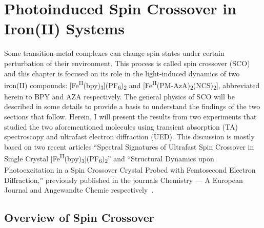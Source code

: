 



\chapter{Photoinduced Spin Crossover in Iron(II) Systems}
\label{ch: SCO}

Some transition-metal complexes can change spin states under certain perturbation of
their environment. This process is called spin crossover (SCO) and this chapter is focused
on its role in the light-induced dynamics of two iron(II) compounds:
[Fe\textsuperscript{II}(bpy)\textsubscript{3}](PF\textsubscript{6})\textsubscript{2}
and [Fe\textsuperscript{II}(PM-AzA)\textsubscript{2}(NCS)\textsubscript{2}],
abbreviated herein to BPY and AZA respectively.
%
The general physics of SCO will be described in some details to provide a basis to
understand the findings of the two sections that follow. Herein, I will present
the results from two experiments that studied the two aforementioned molecules
using transient absorption (TA) spectroscopy and ultrafast electron diffraction (UED).
This discussion is mostly based on two recent articles ``Spectral Signatures of Ultrafast
Spin Crossover in Single Crystal
[Fe\textsuperscript{II}(bpy)\textsubscript{3}](PF\textsubscript{6})\textsubscript{2}''
and ``Structural Dynamics upon Photoexcitation in a Spin Crossover Crystal Probed with
Femtosecond Electron Diffraction,'' previously published in the journals
Chemistry --- A European Journal and Angewandte Chemie respectively~\cite{Field2016, Jiang2017}.


\section{Overview of Spin Crossover}
\label{sec: SCO-overview}

